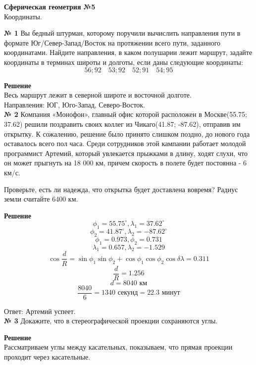 


    \begin{center}
        \textbf{Сферическая геометрия №5}\\
        Координаты.
    \end{center}

    \textbf{№ 1}
    Вы бедный штурман, которому поручили вычислить направления пути в формате Юг/Север-Запад/Восток
    на протяжении всего пути, заданного координатами.
    Найдите направления, в каком полушарии лежит маршрут, задайте координаты в терминах широты и долготы, если даны следующие координаты:\\
    \[
        56;92 \quad 53;92 \quad 52;91 \quad 54;95
    \]

    \textbf{Решение}\\

    Весь маршрут лежит в северной широте и восточной долготе.\\
    Направления: ЮГ, Юго-Запад, Северо-Восток.\\


    \textbf{№ 2}
    Компания «Монофон», главный офис которой расположен в Москве(55.75; 37.62)
    решили поздравить своих коллег из Чикаго(41.87; -87.62), отправив им открытку.
    К сожалению, решение было принято слишком поздно, до нового года оставалось всего
    пол часа.
    Среди сотрудников этой кампании работает молодой программист Артемий, который
    увлекается прыжками в длину, ходят слухи, что он может прыгнуть на 18 000 км,
    причем скорость в полете будет постоянна - 6 км/с.

    Проверьте, есть ли надежда, что открытка будет доставлена вовремя?
    Радиус земли считайте 6400 км.

    \textbf{Решение}\\

    \[
        \phi_1 = 55.75^{\circ}, \lambda_1 = 37.62^{\circ}
    \]
    \[
        \phi_2 = 41.87^{\circ}, \lambda_2 = -87.62^{\circ}
    \]
    \[
        \phi_1 = 0.973, \phi_2 = 0.731
    \]
    \[
        \lambda_1 = 0.657, \lambda_2 = -1.529
    \]
    \[
        \cos \frac{d}{R} = \sin \phi_1 \sin \phi_2 + \cos\phi_1\cos\phi_2 \cos\delta\lambda =
        0.311
    \]
    \[
        \frac{d}{R} = 1.256
    \]
    \[
        d = 8040 \text{ км}
    \]
    \[
        \frac{8040}{6} = 1340 \text{ секунд} = 22.3 \text{ минут}
    \]

    Ответ: Артемий успеет.\\


    \textbf{№ 3}
    Докажите, что в стереографической проекции сохраняются углы.

    \textbf{Решение}\\

    Рассматриваем углы между касательных, показываем, что прямая проекции проходит
    через касательные.

